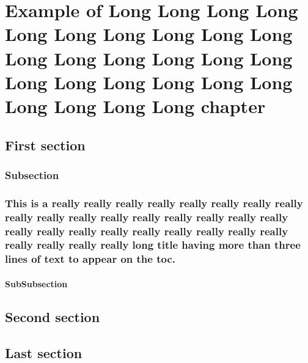 \chapter{Example of Long  Long Long Long Long Long Long Long Long Long Long Long Long Long Long Long Long Long Long Long Long Long Long Long Long Long chapter}
\lipsum[4]
	
\section{First section}
\lipsum[2]
\subsection{Subsection}
\lipsum[5]
\subsection{This is a really really really really really really really really really really really really really really really really really really really really really really really really really really really really really really long title having more than three lines of text to appear on the toc.}
\lipsum[4]
\subsubsection{SubSubsection}
\lipsum[5]

\section{Second section}
\lipsum[4]

\section{Last section} 
\lipsum[6]


